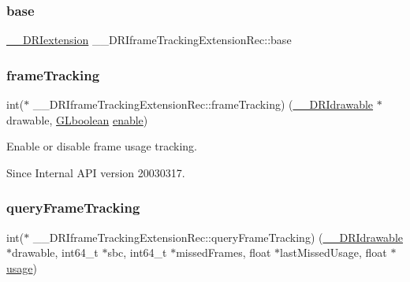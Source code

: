 \subsubsection{\texorpdfstring{base}{base}}
{\footnotesize\ttfamily \hyperlink{dri__interface_8h_a4e0a61c8ece00d2b2c6792a9a1b55385}{\+\_\+\+\_\+\+D\+R\+Iextension} \+\_\+\+\_\+\+D\+R\+Iframe\+Tracking\+Extension\+Rec\+::base}

\mbox{\label{struct_____d_r_iframe_tracking_extension_rec_adccd7dad9d1b661424073213d67af7f6}} 
\subsubsection{\texorpdfstring{frame\+Tracking}{frameTracking}}
{\footnotesize\ttfamily int($\ast$ \+\_\+\+\_\+\+D\+R\+Iframe\+Tracking\+Extension\+Rec\+::frame\+Tracking) (\hyperlink{dri__interface_8h_a5bfb832a0a08208d95b3bbef439d2262}{\+\_\+\+\_\+\+D\+R\+Idrawable} $\ast$drawable, \hyperlink{gl_8h_aea1419aa8aec5854bd9807b45171029d}{G\+Lboolean} \hyperlink{glext_8h_ab0b5c7de20095d30091485d2c60a3dd5}{enable})}

Enable or disable frame usage tracking.

\begin{DoxySince}{Since}
Internal A\+PI version 20030317. 
\end{DoxySince}
\mbox{\label{struct_____d_r_iframe_tracking_extension_rec_aceab750acd6bc8afdd5315d39537a3c2}} 
\subsubsection{\texorpdfstring{query\+Frame\+Tracking}{queryFrameTracking}}
{\footnotesize\ttfamily int($\ast$ \+\_\+\+\_\+\+D\+R\+Iframe\+Tracking\+Extension\+Rec\+::query\+Frame\+Tracking) (\hyperlink{dri__interface_8h_a5bfb832a0a08208d95b3bbef439d2262}{\+\_\+\+\_\+\+D\+R\+Idrawable} $\ast$drawable, int64\+\_\+t $\ast$sbc, int64\+\_\+t $\ast$missed\+Frames, float $\ast$last\+Missed\+Usage, float $\ast$\hyperlink{glcorearb_8h_afb85c5d9b1bce96aa3b530d581194d1a}{usage})}


